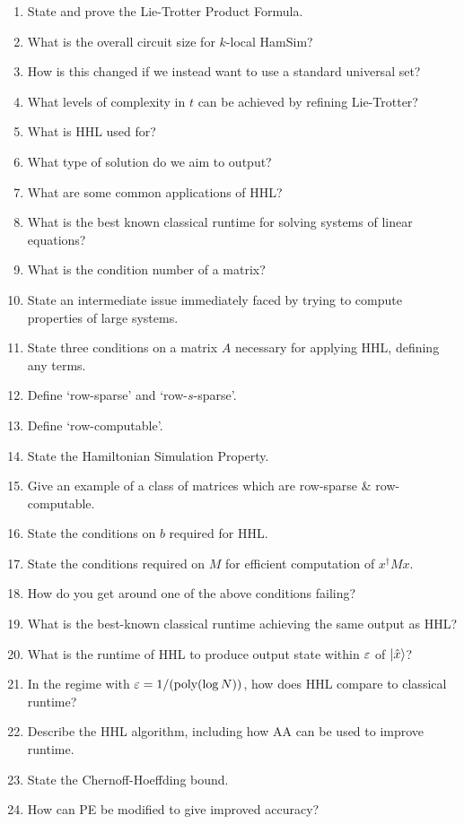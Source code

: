 \documentclass[]{article}
\begin{document}
\begin{enumerate}
    \item State and prove the Lie-Trotter Product Formula.
    \item What is the overall circuit size for $k$-local HamSim?
    \item How is this changed if we instead want to use a standard universal set?
    \item What levels of complexity in $t$ can be achieved by refining Lie-Trotter?
    \item What is HHL used for?
    \item What type of solution do we aim to output?
    \item What are some common applications of HHL?
    \item What is the best known classical runtime for solving systems of linear equations?
    \item What is the condition number of a matrix?
    \item State an intermediate issue immediately faced by trying to compute properties of large systems.
    \item State three conditions on a matrix $A$ necessary for applying HHL, defining any terms.
    \item Define `row-sparse' and `row-$s$-sparse'.
    \item Define `row-computable'.
    \item State the Hamiltonian Simulation Property.
    \item Give an example of a class of matrices which are row-sparse \& row-computable.
    \item State the conditions on $b$ required for HHL.
    \item State the conditions required on $M$ for efficient computation of $x^\dagger Mx$.
    \item How do you get around one of the above conditions failing?
    \item What is the best-known classical runtime achieving the same output as HHL?
    \item What is the runtime of HHL to produce output state within $\varepsilon$ of $\lvert\hat{x}\rangle$?
    \item In the regime with $\varepsilon = 1/(\textrm{poly}(\log N))$, how does HHL compare to classical runtime?
    \item Describe the HHL algorithm, including how AA can be used to improve runtime.
    \item State the Chernoff-Hoeffding bound.
    \item How can PE be modified to give improved accuracy?

\end{enumerate}
\end{document}
